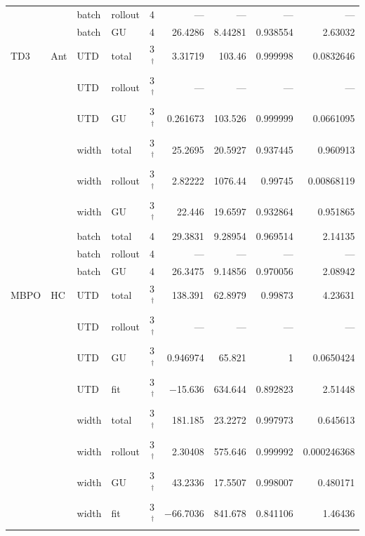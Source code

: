 {\begin{longtable}{@{}llllrrrrr@{}}
     &  & batch & rollout & \num{4} & --- & --- & --- & --- \\
     &  & batch & GU & \num{4} & \num{26.4286} & \num{8.44281} & \num{0.938554} & \num{2.63032} \\
    TD3 & Ant & UTD & total & \num{3}$^{\dagger}$ & \num{3.31719} & \num{103.46} & \num{0.999998} & \num{0.0832646} \\
     &  & UTD & rollout & \num{3}$^{\dagger}$ & --- & --- & --- & --- \\
     &  & UTD & GU & \num{3}$^{\dagger}$ & \num{0.261673} & \num{103.526} & \num{0.999999} & \num{0.0661095} \\
     &  & width & total & \num{3}$^{\dagger}$ & \num{25.2695} & \num{20.5927} & \num{0.937445} & \num{0.960913} \\
     &  & width & rollout & \num{3}$^{\dagger}$ & \num{2.82222} & \num{1076.44} & \num{0.99745} & \num{0.00868119} \\
     &  & width & GU & \num{3}$^{\dagger}$ & \num{22.446} & \num{19.6597} & \num{0.932864} & \num{0.951865} \\
     &  & batch & total & \num{4} & \num{29.3831} & \num{9.28954} & \num{0.969514} & \num{2.14135} \\
     &  & batch & rollout & \num{4} & --- & --- & --- & --- \\
     &  & batch & GU & \num{4} & \num{26.3475} & \num{9.14856} & \num{0.970056} & \num{2.08942} \\
    \midrule
    MBPO & HC & UTD & total & \num{3}$^{\dagger}$ & \num{138.391} & \num{62.8979} & \num{0.99873} & \num{4.23631} \\
     &  & UTD & rollout & \num{3}$^{\dagger}$ & --- & --- & --- & --- \\
     &  & UTD & GU & \num{3}$^{\dagger}$ & \num{0.946974} & \num{65.821} & \num{1} & \num{0.0650424} \\
     &  & UTD & fit & \num{3}$^{\dagger}$ & \num{-15.636} & \num{634.644} & \num{0.892823} & \num{2.51448} \\
     &  & width & total & \num{3}$^{\dagger}$ & \num{181.185} & \num{23.2272} & \num{0.997973} & \num{0.645613} \\
     &  & width & rollout & \num{3}$^{\dagger}$ & \num{2.30408} & \num{575.646} & \num{0.999992} & \num{0.000246368} \\
     &  & width & GU & \num{3}$^{\dagger}$ & \num{43.2336} & \num{17.5507} & \num{0.998007} & \num{0.480171} \\
     &  & width & fit & \num{3}$^{\dagger}$ & \num{-66.7036} & \num{841.678} & \num{0.841106} & \num{1.46436} \\

\end{longtable}}
